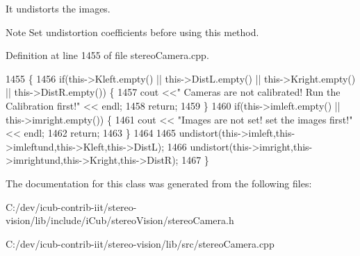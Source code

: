 It undistorts the images. 

\begin{DoxyNote}{Note}
Set undistortion coefficients before using this method. 
\end{DoxyNote}


Definition at line 1455 of file stereo\+Camera.\+cpp.


\begin{DoxyCode}
1455                                    \{
1456     \textcolor{keywordflow}{if}(this->Kleft.empty() || this->DistL.empty() || this->Kright.empty() || this->DistR.empty()) \{
1457         cout <<\textcolor{stringliteral}{" Cameras are not calibrated! Run the Calibration first!"} << endl;
1458         \textcolor{keywordflow}{return};
1459     \}
1460     \textcolor{keywordflow}{if}(this->imleft.empty() || this->imright.empty()) \{
1461         cout << \textcolor{stringliteral}{"Images are not set! set the images first!"} << endl;
1462         \textcolor{keywordflow}{return};
1463     \}
1464 
1465     undistort(this->imleft,this->imleftund,this->Kleft,this->DistL);
1466     undistort(this->imright,this->imrightund,this->Kright,this->DistR);
1467 \}
\end{DoxyCode}


The documentation for this class was generated from the following files\+:\begin{DoxyCompactItemize}
\item 
C\+:/dev/icub-\/contrib-\/iit/stereo-\/vision/lib/include/i\+Cub/stereo\+Vision/stereo\+Camera.\+h\item 
C\+:/dev/icub-\/contrib-\/iit/stereo-\/vision/lib/src/stereo\+Camera.\+cpp\end{DoxyCompactItemize}
